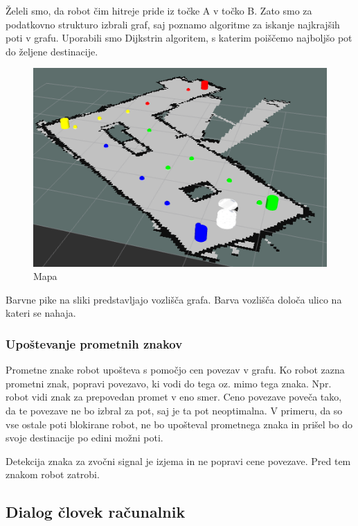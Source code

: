 \documentclass[a4paper,11pt]{article}
\begin{document}
Želeli smo, da robot čim hitreje pride iz točke A v točko B. Zato smo za podatkovno strukturo izbrali graf, saj poznamo algoritme za iskanje najkrajših poti v grafu. Uporabili smo Dijkstrin algoritem, s katerim poiščemo najboljšo pot do željene destinacije.

\begin{figure}[h]
\begin{center}
\includegraphics[scale=0.4]{mapGraph.png}
\caption{Mapa}
\label{slika1}
\end{center}
\end{figure}

Barvne pike na sliki predstavljajo vozlišča grafa. Barva vozlišča določa ulico na kateri se nahaja.

\subsubsection{Upoštevanje prometnih znakov}

Prometne znake robot upošteva s pomočjo cen povezav v grafu. Ko robot zazna prometni znak, popravi povezavo, ki vodi do tega oz. mimo tega znaka. Npr. robot vidi znak za prepovedan promet v eno smer. Ceno povezave poveča tako, da te povezave ne bo izbral za pot, saj je ta pot neoptimalna. V primeru, da so vse ostale poti blokirane robot, ne bo upošteval prometnega znaka in prišel bo do svoje destinacije po edini možni poti.

Detekcija znaka za zvočni signal je izjema in ne popravi cene povezave. Pred tem znakom robot zatrobi.

\subsection{Dialog človek računalnik}
\end{document}
